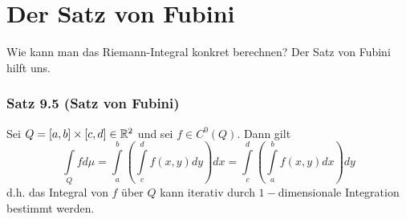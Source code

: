 \section{Der Satz von Fubini}
Wie kann man das Riemann-Integral konkret berechnen? Der Satz von Fubini hilft uns.

\subsubsection*{Satz 9.5 (Satz von Fubini)}
Sei $Q=\lbrack a,b\rbrack\times \lbrack c,d\rbrack\in\mathbb{R}^2$ und sei $f\in C^0\left( Q\right)$. Dann gilt \[\int\limits_Q {fd\mu }  = \int\limits_a^b {\left( {\int\limits_c^d {f\left( {x,y} \right)dy} } \right)dx = \int\limits_c^d {\left( {\int\limits_a^b {f\left( {x,y} \right)dx} } \right)dy} } \]
d.h. das Integral von $f$ über $Q$ kann iterativ durch $1-$dimensionale Integration bestimmt werden.

